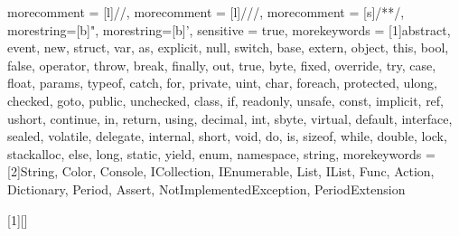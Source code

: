 {
 morecomment = [l]{//}, 
 morecomment = [l]{///},
 morecomment = [s]{/*}{*/},
 morestring=[b]", 
 morestring=[b]', 
 sensitive = true,
 morekeywords = [1]{abstract,  event,  new,  struct, var,
   as,  explicit,  null,  switch,
   base,  extern,  object,  this,
   bool,  false,  operator,  throw,
   break,  finally,  out,  true,
   byte,  fixed,  override,  try,
   case,  float,  params,  typeof,
   catch,  for,  private,  uint,
   char,  foreach,  protected,  ulong,
   checked,  goto,  public,  unchecked,
   class,  if,  readonly,  unsafe,
   const,  implicit,  ref,  ushort,
   continue,  in,  return,  using,
   decimal,  int,  sbyte,  virtual,
   default,  interface,  sealed,  volatile,
   delegate,  internal,  short,  void,
   do,  is,  sizeof,  while,
   double,  lock,  stackalloc,   
   else,  long,  static, yield,
   enum,  namespace,  string},
 morekeywords = [2]{String, Color,
  Console, ICollection, IEnumerable, List, IList, Func, Action, Dictionary,
  Period, Assert, NotImplementedException, PeriodExtension
  }
}


[1][]%
  {\minipage{\linewidth} 
   \lstset{basicstyle=\ttfamily\scriptsize,frame=single,#1}}
  {\endminipage}

\makeatletter
{}
\makeatother